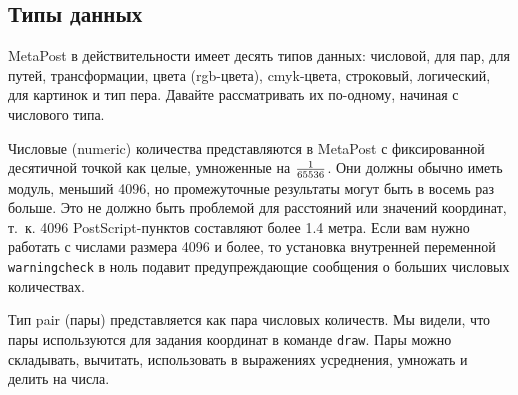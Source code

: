 \documentclass{article} %
\begin{document}
\subsection{Типы данных}

MetaPost в действительности имеет десять типов данных: числовой, 
для пар, для путей, трансформации, цвета (rgb-цвета), cmyk-цвета, строковый, 
логический, для картинок и тип пера. 
Давайте рассматривать их по-одному, начиная с числового типа.

Числовые (numeric) количества представляются в MetaPost с фиксированной 
десятичной точкой как целые, умноженные на $1\over65536$.
Они должны обычно иметь модуль, меньший 4096, но промежуточные результаты могут 
быть в восемь раз больше.
Это не должно быть проблемой для расстояний или значений координат, т.~к. 4096 
PostScript-пунктов составляют более 1.4 метра.
Если вам нужно работать с числами размера 4096 и более, то установка внутренней 
переменной {\tt warningcheck}\label{Dwarncheck} в 
ноль подавит предупреждающие сообщения о больших числовых количествах.

Тип pair (пары)  представляется как пара числовых количеств.
Мы видели, что пары используются для задания координат в команде {\tt draw}.
Пары можно складывать, вычитать, использовать в выражениях усреднения, умножать и 
делить на числа.
\end{document}
